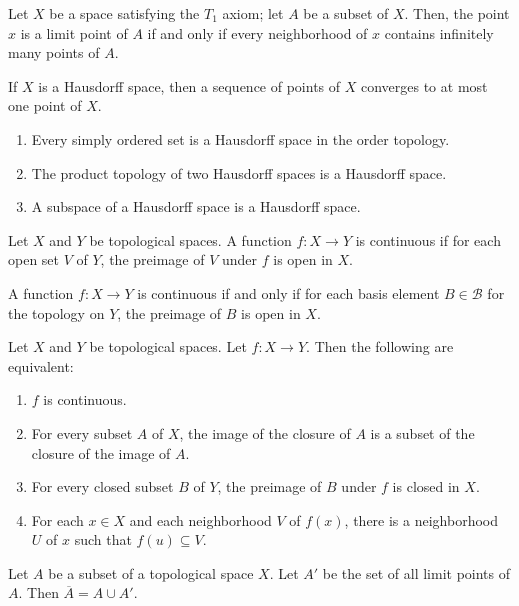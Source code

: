 \documentclass{article}
\newcommand{\B}{\mathcal B}
\begin{document}
\medskip{}

    Let $X$ be a space satisfying the $T_1$ axiom; let $A$ be a subset of $X$. Then, the point $x$ is a limit point of $A$ if and only if every neighborhood of $x$ contains infinitely many points of $A$.

\medskip{}

    If $X$ is a Hausdorff space, then a sequence of points of $X$ converges to at most one point of $X$.

\medskip{}
    \begin{enumerate}
    \item Every simply ordered set is a Hausdorff space in the order topology.
    \item The product topology of two Hausdorff spaces is a Hausdorff space.
    \item A subspace of a Hausdorff space is a Hausdorff space.
    \end{enumerate}

\medskip{}

    Let $X$ and $Y$ be topological spaces. A function $f: X \to Y$ is continuous if for each open set $V$ of $Y$, the preimage of $V$ under $f$ is open in $X$.

\medskip{}

    A function $f: X \to Y$ is continuous if and only if for each basis element $B \in \B$ for the topology on $Y$, the preimage of $B$ is open in $X$.

\medskip{}

    Let $X$ and $Y$ be topological spaces. Let $f: X \to Y$. Then the following are equivalent:
    \begin{enumerate}
        \item $f$ is continuous.
        \item For every subset $A$ of $X$, the image of the closure of $A$ is a subset of the closure of the image of $A$.
        \item For every closed subset $B$ of $Y$, the preimage of $B$ under $f$ is closed in $X$.
        \item For each $x \in X$ and each neighborhood $V$ of $f(x)$, there is a neighborhood $U$ of $x$ such that $f(u) \subseteq V$.
    \end{enumerate}

\medskip{}

    Let $A$ be a subset of a topological space $X$.
    Let $A'$ be the set of all limit points of $A$.
    Then $\overline A = A \cup A'$.
\end{document}

